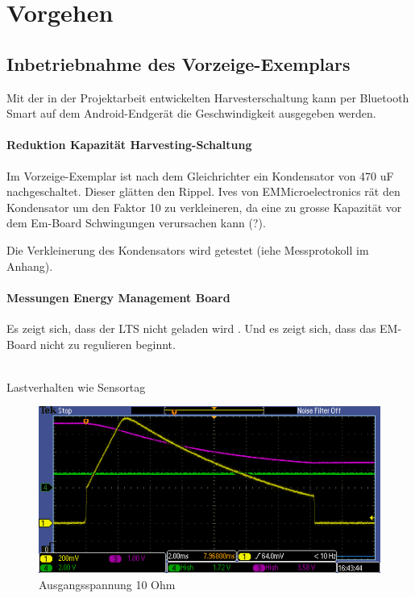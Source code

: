 \chapter{Vorgehen}

\section{Inbetriebnahme des Vorzeige-Exemplars}
Mit der in der Projektarbeit entwickelten Harvesterschaltung kann per Bluetooth Smart auf dem Android-Endgerät die Geschwindigkeit ausgegeben werden. 


\subsubsection{Reduktion Kapazität Harvesting-Schaltung}
Im Vorzeige-Exemplar ist nach dem Gleichrichter ein Kondensator von 470 uF nachgeschaltet. Dieser glätten den Rippel. Ives von EMMicroelectronics rät den Kondensator um den Faktor 10 zu verkleineren, da eine zu grosse Kapazität vor dem Em-Board Schwingungen verursachen kann (?). 

Die Verkleinerung des Kondensators wird getestet (iehe Messprotokoll im Anhang).







\pagebreak 
\subsubsection{Messungen Energy Management Board}

 
Es zeigt sich, dass der LTS nicht geladen wird . Und es zeigt sich, dass das EM-Board nicht zu regulieren beginnt.

\\

Lastverhalten wie Sensortag

\begin{figure}[h]
\includegraphics[bb=0 100 50 50]{EMBoardAusgang10Ohm.PNG}
\caption{Ausgangsspannung 10 Ohm}
\end{figure}

